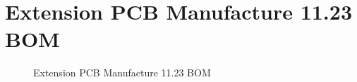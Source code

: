 \section{Extension PCB Manufacture 11.23 BOM}
\label{sec:Extension PCB Manufacture 11.23 BOM}
\begin{figure}[H]
	\centering
	\caption{Extension PCB Manufacture 11.23 BOM}
	\label{fig:Extension PCB Manufacture 11.23 BOM}
\end{figure}
\newpage